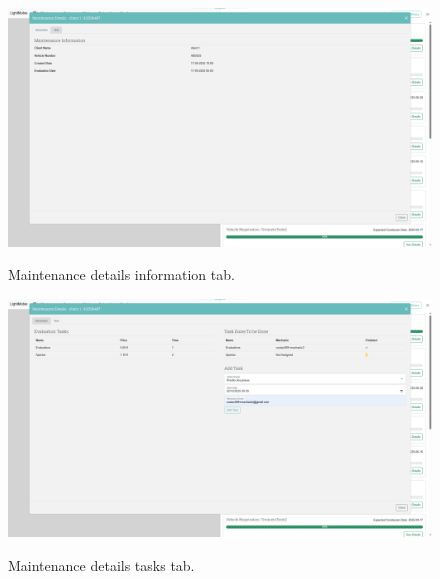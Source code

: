 \begin{figure}[htbp]
  \caption{Maintenance details information tab.}
  \centering
  \includegraphics[width=\textwidth]{figs/Implementation/workshopmanager/maintenanceDetails}
  \label{fig:workshopmanagerMaintenanceDetails}
\end{figure}

\begin{figure}[htbp]
  \caption{Maintenance details tasks tab.}
  \centering
  \includegraphics[width=\textwidth]{figs/Implementation/workshopmanager/maintenanceDetailsTask}
  \label{fig:workshopmanagerMaintenanceDetailsTask}
\end{figure}


